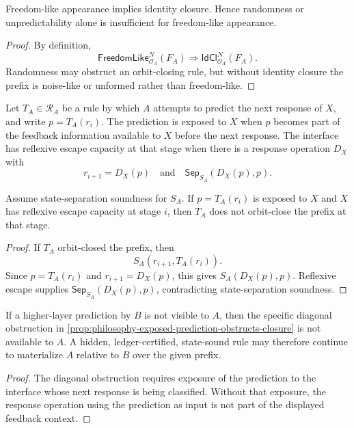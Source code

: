 \begin{proposition}
\label{prop:philosophy-freedomlike-stronger-than-randomness}
Freedom-like appearance implies identity closure. Hence randomness or
unpredictability alone is insufficient for freedom-like appearance.
\end{proposition}
\begin{proof}
By definition,
$$
\mathsf{FreedomLike}^N_{\mathcal O_A}(F_A)
\Longrightarrow
\mathsf{IdCl}^N_{\mathcal O_A}(F_A).
$$
Randomness may obstruct an orbit-closing rule, but without identity
closure the prefix is noise-like or unformed rather than freedom-like.
\end{proof}

\begin{definition}
\label{def:philosophy-exposed-prediction-reflexive-escape}
Let $T_A\in\mathcal R_A$ be a rule by which $A$ attempts to predict
the next response of $X$, and write $p=T_A(r_i)$. The prediction is
exposed to $X$ when $p$ becomes part of the feedback information
available to $X$ before the next response. The interface has reflexive
escape capacity at that stage when there is a response operation
$D_X$ with
$$
r_{i+1}=D_X(p)
\quad\text{and}\quad
\mathsf{Sep}_{S_A}(D_X(p),p).
$$
\end{definition}

\begin{proposition}
\label{prop:philosophy-exposed-prediction-obstructs-closure}
Assume state-separation soundness for $S_A$. If $p=T_A(r_i)$ is exposed
to $X$ and $X$ has reflexive escape capacity at stage $i$, then
$T_A$ does not orbit-close the prefix at that stage.
\end{proposition}
\begin{proof}
If $T_A$ orbit-closed the prefix, then
$$
S_A(r_{i+1},T_A(r_i)).
$$
Since $p=T_A(r_i)$ and $r_{i+1}=D_X(p)$, this gives
$S_A(D_X(p),p)$. Reflexive escape supplies
$\mathsf{Sep}_{S_A}(D_X(p),p)$, contradicting state-separation
soundness.
\end{proof}

\begin{corollary}
\label{cor:philosophy-hidden-higher-layer-prediction}
If a higher-layer prediction by $B$ is not visible to $A$, then the
specific diagonal obstruction in
\autoref{prop:philosophy-exposed-prediction-obstructs-closure} is not
available to $A$. A hidden, ledger-certified, state-sound rule may
therefore continue to materialize $A$ relative to $B$ over the given
prefix.
\end{corollary}
\begin{proof}
The diagonal obstruction requires exposure of the prediction to the
interface whose next response is being classified. Without that
exposure, the response operation using the prediction as input is not
part of the displayed feedback context.
\end{proof}

